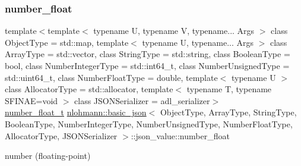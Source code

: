 \subsubsection{\texorpdfstring{number\_float}{number\_float}}
{\footnotesize\ttfamily template$<$template$<$ typename U, typename V, typename... Args $>$ class Object\+Type = std\+::map, template$<$ typename U, typename... Args $>$ class Array\+Type = std\+::vector, class String\+Type  = std\+::string, class Boolean\+Type  = bool, class Number\+Integer\+Type  = std\+::int64\+\_\+t, class Number\+Unsigned\+Type  = std\+::uint64\+\_\+t, class Number\+Float\+Type  = double, template$<$ typename U $>$ class Allocator\+Type = std\+::allocator, template$<$ typename T, typename S\+F\+I\+N\+A\+E=void $>$ class J\+S\+O\+N\+Serializer = adl\+\_\+serializer$>$ \\
\mbox{\hyperlink{classnlohmann_1_1basic__json_a88d6103cb3620410b35200ee8e313d97}{number\+\_\+float\+\_\+t}} \mbox{\hyperlink{classnlohmann_1_1basic__json}{nlohmann\+::basic\+\_\+json}}$<$ Object\+Type, Array\+Type, String\+Type, Boolean\+Type, Number\+Integer\+Type, Number\+Unsigned\+Type, Number\+Float\+Type, Allocator\+Type, J\+S\+O\+N\+Serializer $>$\+::json\+\_\+value\+::number\+\_\+float}



number (floating-\/point) 

\mbox{\label{unionnlohmann_1_1basic__json_1_1json__value_afa3c414445aeffb56a7c6926f9420941}} 
